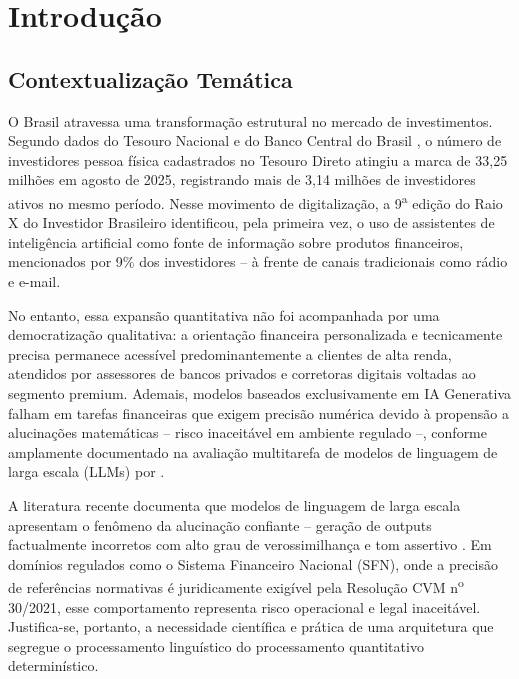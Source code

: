 \chapter{Introdu\c{c}\~ao}
\label{cap:introducao}

\section{Contextualiza\c{c}\~ao Tem\'atica}
\label{sec:contextualizacao}

O Brasil atravessa uma transforma\c{c}\~ao estrutural no mercado de
investimentos. Segundo dados do Tesouro Nacional e do Banco Central do
Brasil \autocite{bcbtesouro2025}, o n\'umero de investidores pessoa f\'isica
cadastrados no Tesouro Direto atingiu a marca de 33,25 milh\~oes em agosto
de 2025, registrando mais de 3,14 milh\~oes de investidores ativos no
mesmo per\'iodo. Nesse movimento de digitaliza\c{c}\~ao, a 9\textsuperscript{a}
edi\c{c}\~ao do Raio X do Investidor Brasileiro \autocite{anbima2026}
identificou, pela primeira vez, o uso de assistentes de intelig\^encia
artificial como fonte de informa\c{c}\~ao sobre produtos financeiros,
mencionados por 9\% dos investidores -- \`a frente de canais tradicionais
como r\'adio e e-mail.

No entanto, essa expans\~ao quantitativa n\~ao foi acompanhada por uma
democratiza\c{c}\~ao qualitativa: a orienta\c{c}\~ao financeira
personalizada e tecnicamente precisa permanece acess\'ivel
predominantemente a clientes de alta renda, atendidos por assessores de
bancos privados e corretoras digitais voltadas ao segmento premium.
Ademais, modelos baseados exclusivamente em IA Generativa falham em
tarefas financeiras que exigem precis\~ao num\'erica devido \`a
propens\~ao a alucina\c{c}\~oes matem\'aticas -- risco inaceit\'avel em
ambiente regulado --, conforme amplamente documentado na avalia\c{c}\~ao
multitarefa de modelos de linguagem de larga escala (LLMs) por
\textcite{bang2023}.

A literatura recente documenta que modelos de linguagem de larga escala
apresentam o fen\^omeno da alucina\c{c}\~ao confiante -- gera\c{c}\~ao de
outputs factualmente incorretos com alto grau de verossimilhan\c{c}a e tom
assertivo \autocite{bang2023}. Em dom\'inios regulados como o Sistema
Financeiro Nacional (SFN), onde a precis\~ao de refer\^encias normativas \'e
juridicamente exig\'ivel pela Resolu\c{c}\~ao CVM n\textsuperscript{o}
30/2021, esse comportamento representa risco operacional e legal
inaceit\'avel. Justifica-se, portanto, a necessidade cient\'ifica e
pr\'atica de uma arquitetura que segregue o processamento lingu\'istico do
processamento quantitativo determin\'istico.

